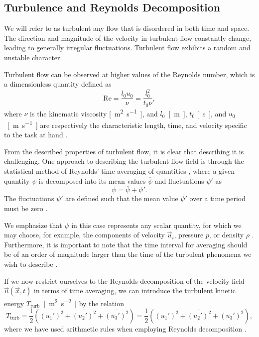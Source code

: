 \subsection{Turbulence and Reynolds Decomposition}\label{turb}
We will refer to as turbulent any flow that is disordered in both time and space. The direction and magnitude of the velocity in turbulent flow constantly change, leading to generally irregular fluctuations. Turbulent flow exhibits a random and unstable character.

Turbulent flow can be observed at higher values of the Reynolds number, which is a dimensionless quantity defined as
\begin{equation}\label{Re}
	\mathrm{Re} = \dfrac{l_{0} u_{0}}{\nu} = \dfrac{l^{2}_{0}}{t_{0} \nu},
\end{equation}
where $ \nu $ is the kinematic viscosity \si{[m^2.s^{-1}]}, and $ l_{0} $~\si{[m]}, $ t_{0} $ \si{[s]}, and $ u_{0} $~\si{[m.s^{-1}]} are respectively the characteristic length, time, and velocity specific to the task at hand \cite{Landau}.

From the described properties of turbulent flow, it is clear that describing it is challenging. One approach to describing the turbulent flow field is through the statistical method of Reynolds' time averaging of quantities \cite{Sodja2007}, where a given quantity $ \psi $ is decomposed into its mean values $ \overline{\psi} $ and fluctuations $ \psi ' $ as
\begin{equation}
	\psi = \overline{\psi} + \psi '.
\end{equation}
The fluctuations $ \psi ' $ are defined such that the mean value $ \overline{\psi '} $ over a time period must be zero \cite{Schlichting}.

We emphasize that $ \psi $ in this case represents any scalar quantity, for which we may choose, for example, the components of velocity $ \vec{u}_i $, pressure $ p $, or density $ \rho $ \cite{Sodja2007}. Furthermore, it is important to note that the time interval for averaging
should be of an order of magnitude larger than the time
of the turbulent phenomena we wish to describe \cite{Sodja2007}.

If we now restrict ourselves to the Reynolds decomposition of the velocity field $ \vec{u} (\vec{x}, t) $ in terms of time averaging, we can introduce the turbulent kinetic energy $ T_{\text{turb}} $~\si{[m^{2}.s^{-2}]} by the relation
\begin{equation}\label{eq:turb kin energy}
	T_{\text{turb}} = \dfrac{1}{2} \left( \overline{(u_1 ')^2} + \overline{(u_2 ')^2} + \overline{(u_3 ')^2} \right) = \dfrac{1}{2} \left( \overline{(u_1 ')^2 + (u_2 ')^2 + (u_3 ')^2} \right),
\end{equation}
where we have used arithmetic rules when employing Reynolds decomposition \cite{Sodja2007}.

